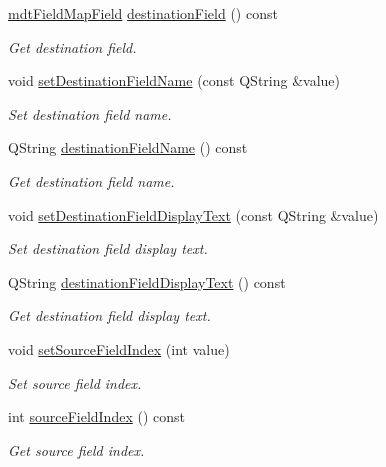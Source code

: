 \begin{DoxyCompactItemize}
\hyperlink{classmdt_field_map_field}{mdt\-Field\-Map\-Field} \hyperlink{classmdt_field_map_item_a1a76d3726880571895c5d90f9082c0cf}{destination\-Field} () const 
\begin{DoxyCompactList}\small\item\em Get destination field. \end{DoxyCompactList}\item 
void \hyperlink{classmdt_field_map_item_afd58131972b117c56b73f4466d7b508f}{set\-Destination\-Field\-Name} (const Q\-String \&value)
\begin{DoxyCompactList}\small\item\em Set destination field name. \end{DoxyCompactList}\item 
Q\-String \hyperlink{classmdt_field_map_item_a0950eb6ad45c1e1c3068f8c27e0363e8}{destination\-Field\-Name} () const 
\begin{DoxyCompactList}\small\item\em Get destination field name. \end{DoxyCompactList}\item 
void \hyperlink{classmdt_field_map_item_a3378daa266d132501e6a3feb9cf6ebf8}{set\-Destination\-Field\-Display\-Text} (const Q\-String \&value)
\begin{DoxyCompactList}\small\item\em Set destination field display text. \end{DoxyCompactList}\item 
Q\-String \hyperlink{classmdt_field_map_item_a8ea2ad8c7b3fdf22a140560a4fc93094}{destination\-Field\-Display\-Text} () const 
\begin{DoxyCompactList}\small\item\em Get destination field display text. \end{DoxyCompactList}\item 
void \hyperlink{classmdt_field_map_item_a6417b5e9d5cabba4744550e69869b0da}{set\-Source\-Field\-Index} (int value)
\begin{DoxyCompactList}\small\item\em Set source field index. \end{DoxyCompactList}\item 
int \hyperlink{classmdt_field_map_item_a008cc7bc43612f6df87ba62e14aed6ab}{source\-Field\-Index} () const 
\begin{DoxyCompactList}\small\item\em Get source field index. \end{DoxyCompactList}\item 

\end{DoxyCompactItemize}
